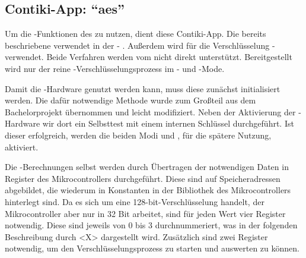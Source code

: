 \subsection{Contiki-App: "`aes"'}

Um die -Funktionen des  \cite{mc1322} zu nutzen, dient diese Contiki-App. Die bereits beschriebene 
verwendet in der  - \cite{rfc4493}. Außerdem wird für die Verschlüsselung - \cite{rfc3610} verwendet. Beide Verfahren
werden vom  nicht direkt unterstützt. Bereitgestellt wird nur der reine -Verschlüsselungsprozess im - und -Mode.

Damit die -Hardware genutzt werden kann, muss diese zunächst initialisiert werden. Die dafür notwendige Methode wurde zum Großteil aus dem Bachelorprojekt 
übernommen und leicht modifiziert. Neben der Aktivierung der -Hardware wir dort ein Selbsttest mit einem internen Schlüssel durchgeführt. Ist dieser
erfolgreich, werden die beiden Modi  und , für die spätere Nutzung, aktiviert.

Die -Berechnungen selbst werden durch Übertragen der notwendigen Daten in Register des Mikrocontrollers durchgeführt. Diese sind auf Speicheradressen
abgebildet, die wiederum in Konstanten in der Bibliothek des Mikrocontrollers hinterlegt sind. Da es sich um eine 128-bit-Verschlüsselung handelt, der Mikrocontroller
aber nur in 32 Bit arbeitet, sind für jeden Wert vier Register notwendig. Diese sind jeweils von 0 bis 3 durchnummeriert, was in der folgenden Beschreibung durch <X>
dargestellt wird. Zusätzlich sind zwei Register notwendig, um den Verschlüsselungsprozess zu starten und auswerten zu können.

